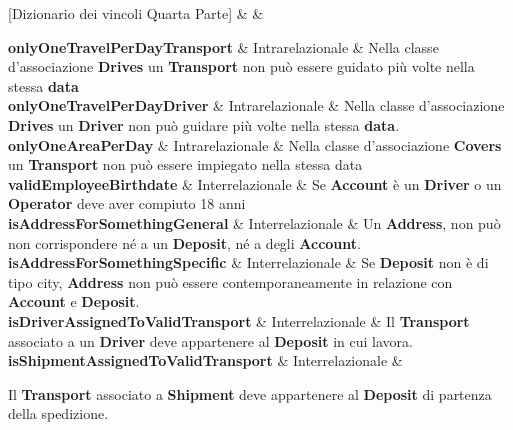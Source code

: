 [Dizionario dei vincoli Quarta Parte]{ &  & }{
  

  \textbf{onlyOneTravelPerDayTransport} & Intrarelazionale & 
  {\footnotesize
  Nella classe d’associazione \textbf{Drives} un \textbf{Transport} non può essere guidato più volte nella stessa \textbf{data}
  }\\

  \textbf{onlyOneTravelPerDayDriver} & Intrarelazionale &
  {\footnotesize
  Nella classe d’associazione \textbf{Drives} un \textbf{Driver} non può guidare più volte nella stessa \textbf{data}.
  }\\

  \textbf{onlyOneAreaPerDay} & Intrarelazionale & 
  {\footnotesize    
  Nella classe d’associazione \textbf{Covers} un \textbf{Transport} non può essere impiegato nella stessa data
  }\\

  \textbf{validEmployeeBirthdate} & Interrelazionale &
  {\footnotesize
  Se \textbf{Account} è un \textbf{Driver} o un \textbf{Operator} deve aver compiuto 18 anni
  }\\

  \textbf{isAddressForSomethingGeneral}\label{isAddressForSomethingGeneral} & Interrelazionale &
  {\footnotesize
  Un \textbf{Address}, non può non corrispondere né a un \textbf{Deposit}, né a degli \textbf{Account}.
  }\\

  \textbf{isAddressForSomethingSpecific} & Interrelazionale &
  {\footnotesize
  Se \textbf{Deposit} non è di tipo city, \textbf{Address} non può essere contemporaneamente in relazione con \textbf{Account} e \textbf{Deposit}. 
  }\\

  \textbf{isDriverAssignedToValidTransport} & Interrelazionale &
  {\footnotesize
  Il \textbf{Transport} associato a un \textbf{Driver} deve appartenere al \textbf{Deposit} in cui lavora.
  }\\

  \textbf{isShipmentAssignedToValidTransport} & Interrelazionale &
  {\footnotesize

  Il \textbf{Transport } associato a \textbf{Shipment} deve appartenere al \textbf{Deposit} di partenza della spedizione.
  }\\
}

